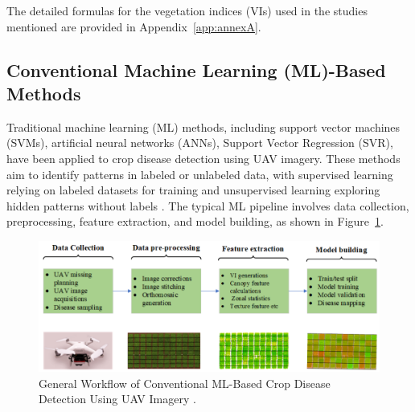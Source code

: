The detailed formulas for the vegetation indices (VIs) used in the studies mentioned are provided in Appendix~\ref{app:annexA}.
\begin{table}[htbp]
    \caption{Summary of ST-based methods for Wheat disease estimation using UAV imagery.}
    \centering
    \label{tab:summary}
\end{table}



\subsection{Conventional Machine Learning (ML)-Based Methods}
Traditional machine learning (ML) methods, including support vector machines (SVMs), artificial neural networks (ANNs), Support Vector Regression (SVR), have been applied to crop disease detection using UAV imagery. These methods aim to identify patterns in labeled or unlabeled data, with supervised learning relying on labeled datasets for training and unsupervised learning exploring hidden patterns without labels \parencite{shahi2023recent}. The typical ML pipeline involves data collection, preprocessing, feature extraction, and model building, as shown in Figure~\ref{fig:MLBased}.

\begin{figure}[H]
    \centering
    \includegraphics[width=0.8
    \textwidth]{chapters/chapter3/images/Figure08.png}
    \caption{General Workflow of Conventional ML-Based Crop Disease Detection Using UAV Imagery \parencite{shahi2023recent}.}
    \label{fig:MLBased}
\end{figure}


